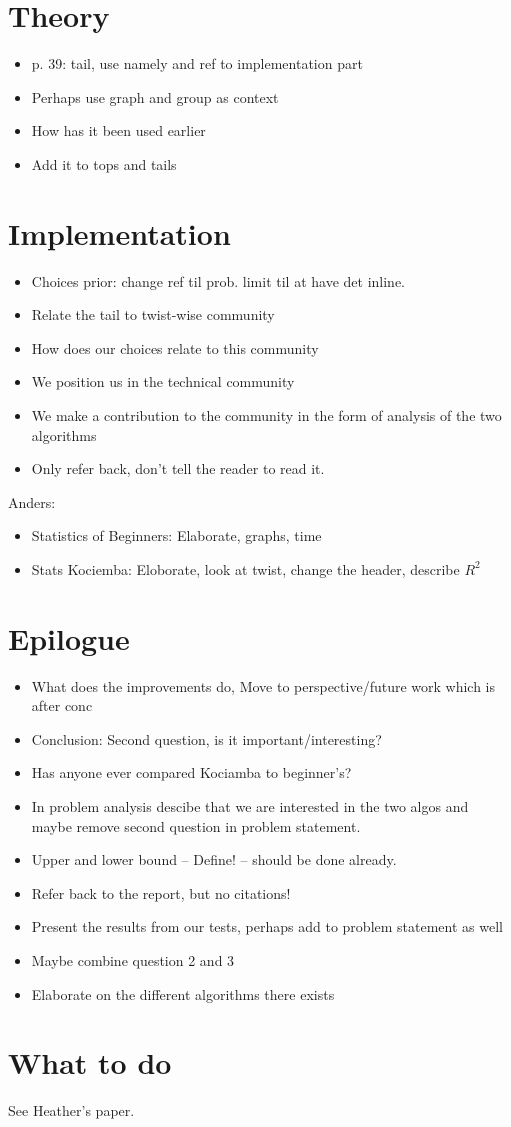 \documentclass{article}
\begin{document}
\section{Theory}
\begin{itemize}
	\item p. 39: tail, use namely and ref to implementation part
	\item Perhaps use graph and group as context
	\item How has it been used earlier
	\item Add it to tops and tails
\end{itemize}

\section{Implementation}
\begin{itemize}
	\item Choices prior: change ref til prob. limit til at have det inline.
	\item Relate the tail to twist-wise community
	\item How does our choices relate to this community
	\item We position us in the technical community
	\item We make a contribution to the community in the form of analysis of the two algorithms
	\item Only refer back, don't tell the reader to read it.
\end{itemize}

Anders:
\begin{itemize}
	\item Statistics of Beginners: Elaborate, graphs, time
	\item Stats Kociemba: Eloborate, look at twist, change the header, describe $R^2$
\end{itemize}

\section{Epilogue}
\begin{itemize}
	\item What does the improvements do, Move to perspective/future work which is after conc
	\item Conclusion: Second question, is it important/interesting?
	\item Has anyone ever compared Kociamba to beginner's?
	\item In problem analysis descibe that we are interested in the two algos and maybe remove second question in problem statement.
	\item Upper and lower bound -- Define! -- should be done already.
	\item Refer back to the report, but no citations!
	\item Present the results from our tests, perhaps add to problem statement as well
	\item Maybe combine question 2 and 3
	\item Elaborate on the different algorithms there exists
\end{itemize}

\section{What to do}
See Heather's paper.
\end{document}
